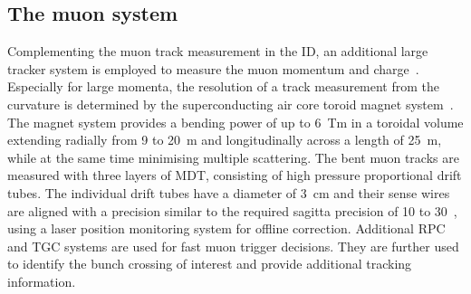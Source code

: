 \subsection{The muon system}
Complementing the muon track measurement in the \gls{ID}, an additional large tracker system is employed to measure the muon momentum and charge~\cite{muon1,muon2}. Especially for large momenta, the resolution of a track measurement from the curvature is determined by the superconducting air core toroid magnet system~\cite{Magnet1}. The magnet system provides a bending power of up to 6~Tm in a toroidal volume extending radially from 9 to 20~m and longitudinally across a length of 25~m, while at the same time minimising multiple scattering. 
%
The bent muon tracks are measured with three layers of \gls{MDT}, consisting of high pressure proportional drift tubes. The  individual drift tubes have a diameter of 3~cm and their sense wires are aligned with a precision similar to the required sagitta precision of 10 to 30~\mum, using a laser position monitoring system for offline correction.
Additional \gls{RPC} and \gls{TGC} systems are used for fast muon trigger decisions. They are further used to identify the bunch crossing of interest and provide additional tracking information.










